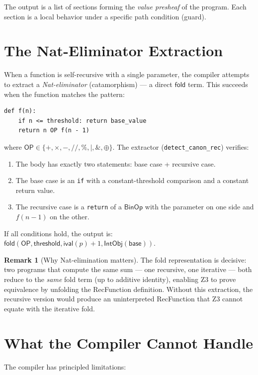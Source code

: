 \documentclass[11pt,a4paper]{report}
\theoremstyle{definition}
\newtheorem{remark}[definition]{Remark}
\theoremstyle{plain}
\newcommand{\fold}{\mathsf{fold}}
\begin{document}
The output is a list of sections forming the \emph{value presheaf}
of the program.  Each section is a local behavior under a specific
path condition (guard).

\section{The Nat-Eliminator Extraction}

When a function is self-recursive with a single parameter, the
compiler attempts to extract a \emph{Nat-eliminator}
(catamorphism) --- a direct $\fold$ term.  This succeeds when the
function matches the pattern:
\begin{lstlisting}
def f(n):
    if n <= threshold: return base_value
    return n OP f(n - 1)
\end{lstlisting}
where $\mathsf{OP} \in \{+, \times, -, //, \%, |, \&, \oplus\}$.
The extractor (\texttt{detect\_canon\_rec}) verifies:
\begin{enumerate}
  \item The body has exactly two statements: base case + recursive case.
  \item The base case is an \texttt{if} with a constant-threshold
    comparison and a constant return value.
  \item The recursive case is a \texttt{return} of a
    $\mathsf{BinOp}$ with the parameter on one side and
    $f(n-1)$ on the other.
\end{enumerate}
If all conditions hold, the output is:
$\fold(\mathsf{OP}, \mathsf{threshold}, \mathsf{ival}(p) + 1,
\mathsf{IntObj}(\mathsf{base}))$.

\begin{remark}[Why Nat-elimination matters]
The fold representation is decisive: two programs that compute the
same sum --- one recursive, one iterative --- both reduce to the
\emph{same} fold term (up to additive identity), enabling Z3 to
prove equivalence by unfolding the RecFunction definition.
Without this extraction, the recursive version would produce an
uninterpreted RecFunction that Z3 cannot equate with the iterative
fold.
\end{remark}

\section{What the Compiler Cannot Handle}

The compiler has principled limitations:
\end{document}
